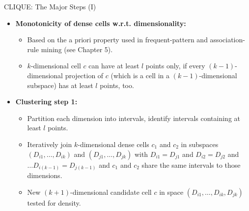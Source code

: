 \begin{frame}{CLIQUE: The Major Steps (I)}
	\begin{itemize}
		\item \textbf{Monotonicity of dense cells w.r.t. dimensionality:}
		      \begin{itemize}
			      \item Based on the a priori property used in frequent-pattern and
			            association-rule mining (see Chapter 5).
			      \item $k$-dimensional cell $c$ can have at least $l$ points only,
			            if every $(k-1)$-dimensional projection of $c$ (which is a cell in
			            a $(k-1)$-dimensional subspace) has at least $l$ points, too.
		      \end{itemize}
		\item \textbf{Clustering step 1:}
		      \begin{itemize}
			      \item Partition each dimension into intervals, identify intervals
			            containing at least $l$ points.
			      \item Iteratively join $k$-dimensional dense cells $c_1$ and $c_2$
			            in subspaces $(D_{i1}, \ldots, D_{ik})$ and $(D_{j1}, \ldots,
				            D_{jk})$ with $D_{i1} = D_{j1}$ and $D_{i2} = D_{j2}$ and $\ldots
				            D_{i(k-1)} = D_{j(k-1)}$ and $c_1$ and $c_2$ share the same
			            intervals to those dimensions.
			      \item New $(k+1)$-dimensional candidate cell $c$ in space $(D_{i1},
				            \ldots, D_{ik}, D_{jk})$ tested for density.
		      \end{itemize}
	\end{itemize}
\end{frame}

